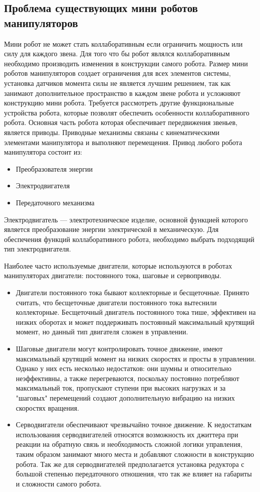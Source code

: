 \subsection{Проблема существующих мини роботов манипуляторов}
Мини робот не может стать коллаборативным если ограничить мощность или силу для каждого звена. Для того что бы робот являлся коллаборативным необходимо производить изменения в конструкции самого робота.
Размер мини роботов манипуляторов создает ограничения для всех элементов системы, установка датчиков момента силы не является лучшим решением, так как занимают дополнительное пространство в каждом звене робота и усложняют конструкцию мини робота. Требуется рассмотреть другие функциональные устройства робота, которые позволят обеспечить особенности коллаборативного робота. Основная часть робота которая обеспечивает передвижения звеньев, является приводы. Приводные механизмы связаны с кинематическими элементами манипулятора и выполняют перемещения.
Привод любого робота манипулятора состоит из:
\begin{itemize}
	\item Преобразователя энергии
	\item Электродвигателя
	\item Передаточного механизма
\end{itemize}

Электродвигатель —  электротехническое изделие, основной функцией которого является преобразование энергии электрической в механическую. Для обеспечения функций коллаборативного робота, необходимо выбрать подходящий тип электродвигателя.

Наиболее часто используемые двигатели, которые используются в роботах манипуляторах двигатели: постоянного тока, шаговые и сервоприводы.
\begin{itemize}
	\item Двигатели постоянного тока бывают коллекторные и бесщеточные. Принято считать, что бесщеточные двигатели постоянного тока вытеснили коллекторные. Бесщеточный двигатель постоянного тока тише, эффективен на низких оборотах и может поддерживать постоянный максимальный крутящий момент, но данный тип двигателя сложен в управлении\citep{medicaldesignbriefsBrushedVersus}.
	\item Шаговые двигатели могут контролировать точное движение, имеют максимальный крутящий момент на низких скоростях и просты в управлении. Однако у них есть несколько недостатков: они шумны и относительно неэффективны, а также перегреваются, поскольку постоянно потребляют максимальный ток, пропускают ступени при высоких нагрузках и за "шаговых" перемещений создают дополнительную вибрацию на низких скоростях вращения\citep{Steppermotorvibrations}.
	\item Серводвигатели обеспечивают чрезвычайно точное движение. К недостаткам использования серводвигателей относятся возможность их джиттера при реакции на обратную связь и необходимость сложной логики управления, таким образом занимают много места и добавляют сложности в конструкцию робота. Так же для серводвигателей предполагается установка редуктора с большой степенью передаточного отношения, что так же влияет на габариты и сложности самого робота.
\end{itemize}


